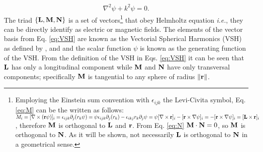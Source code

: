 \begin{align}
	\nabla^2 \psi + k^2 \psi = 0.
\label{eq:HelmoltzScalar}
\end{align}
%
The triad $\left\{\vb{L},\vb{M},\vb{N}\right\}$ is a set of vectors\footnote{%
	Employing the Einstein sum convention with $\epsilon_{ijk}$ the Levi-Civita symbol, Eq. \eqref{eq:M} can be the written as follows:%
	 	$M_i = [\nabla\times(\vb{r}\psi)]_i
	 	=  \epsilon_{ijk}\partial_j(r_k\psi)
	 	=\psi\epsilon_{ijk}\partial_j(r_k) -\epsilon_{ikj}r_k\partial_j\psi
	 	=\psi[\nabla\times\vb{r}]_i - [\vb{r}\times\nabla\psi]_i
	 	= - [\vb{r}\times\nabla\psi]_i
	 	= [\vb{L}\times\vb{r}]_i$,%
	 therefore $\vb{M}$ is orthogonal to $\vb{L}$ and $\vb{r}$. From Eq. \eqref{eq:N} $\vb{M}\cdot\vb{N}=0$, so $\vb{M}$ is orthogonal to $\vb{N}$. As it will be shown, not necessarily $\vb{L}$ is orthogonal to $\vb{N}$ in a geometrical sense.
	}
 that obey Helmholtz equation \textit{i.e.}, they can be directly identify as electric or magnetic fields. The elements of the vector basis from Eq. \eqref{eq:VSH}   are known as the Vectorial Spherical Harmonics (VSH) as defined by  \citeauthor{stratton_electromagnetic_2012} \cite{stratton_electromagnetic_2012}, and \citeauthor{bohren_absorption_1983} \cite{bohren_absorption_1983} and the scalar function $\psi$ is known as the generating function of the VSH. From the definition of the VSH in Eqs. \eqref{eq:VSH} it can be seen that $\vb{L}$ has only a longitudinal component while $\vb{M}$ and $\vb{N}$ have only transversal components; specifically $\vb{M}$ is tangential to any sphere of radius $\norm{\vb{r}}$.


